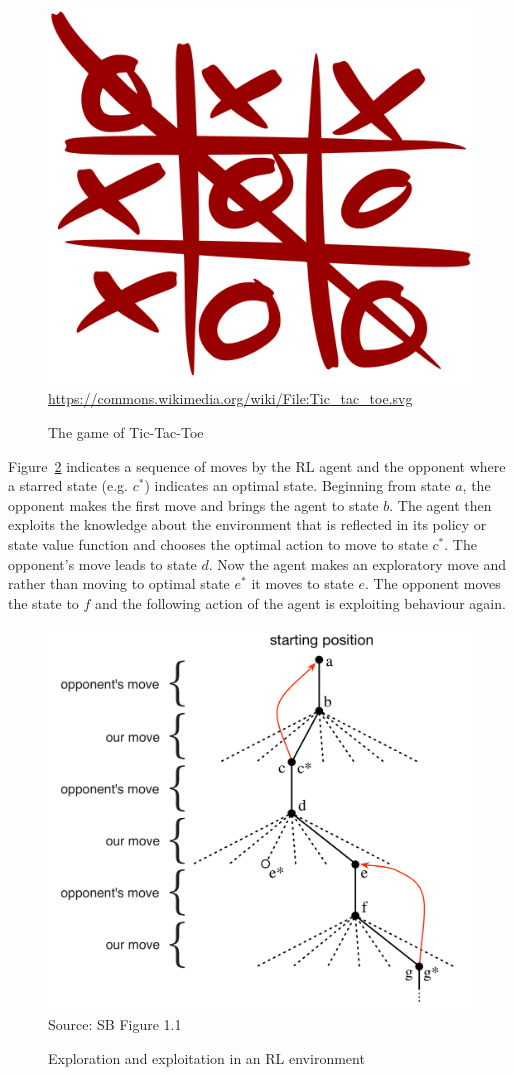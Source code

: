 \begin{figure}
\centering
\includegraphics[width=.25\textwidth]{Tic_tac_toe.png} \\
\vspace{\baselineskip}
\scriptsize \url{https://commons.wikimedia.org/wiki/File:Tic_tac_toe.svg}
\caption{The game of Tic-Tac-Toe}
\label{fig:tictactoe}
\end{figure}

Figure~\ref{fig:screen1_chap21} indicates a sequence of moves by the RL agent and the opponent where a starred state (e.g. $c^*$) indicates an optimal state. Beginning from state $a$, the opponent makes the first move and brings the agent to state $b$. The agent then exploits the knowledge about the environment that is reflected in its policy or state value function and chooses the optimal action to move to state $c^*$. The opponent's move leads to state $d$. Now the agent makes an exploratory move and rather than moving to optimal state $e^*$ it moves to state $e$. The opponent moves the state to $f$ and the following action of the agent is exploiting behaviour again. 


\begin{figure}
\centering
\includegraphics[width=.75\textwidth]{screen1.png} \\
\centering
\scriptsize Source: SB Figure 1.1
\caption{Exploration and exploitation in an RL environment}
\label{fig:screen1_chap21}
\end{figure}

